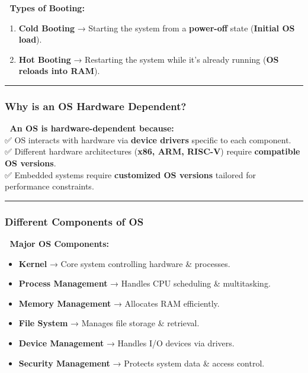\documentclass[
]{article}
\providecommand{\tightlist}{%
  \setlength{\itemsep}{0pt}\setlength{\parskip}{0pt}}
\begin{document}
📌 \textbf{Types of Booting:}

\begin{enumerate}
\def\labelenumi{\arabic{enumi}.}
\tightlist
\item
  \textbf{Cold Booting} → Starting the system from a \textbf{power-off}
  state (\textbf{Initial OS load}).
\item
  \textbf{Hot Booting} → Restarting the system while it's already
  running (\textbf{OS reloads into RAM}).
\end{enumerate}

\begin{center}\rule{0.5\linewidth}{0.5pt}\end{center}

\subsubsection{\texorpdfstring{\textbf{Why is an OS Hardware
Dependent?}}{Why is an OS Hardware Dependent?}}\label{why-is-an-os-hardware-dependent}

📌 \textbf{An OS is hardware-dependent because:}\\
✅ OS interacts with hardware via \textbf{device drivers} specific to
each component.\\
✅ Different hardware architectures (\textbf{x86, ARM, RISC-V}) require
\textbf{compatible OS versions}.\\
✅ Embedded systems require \textbf{customized OS versions} tailored for
performance constraints.

\begin{center}\rule{0.5\linewidth}{0.5pt}\end{center}

\subsubsection{\texorpdfstring{\textbf{Different Components of
OS}}{Different Components of OS}}\label{different-components-of-os}

📌 \textbf{Major OS Components:}

\begin{itemize}
\tightlist
\item
  \textbf{Kernel} → Core system controlling hardware \& processes.
\item
  \textbf{Process Management} → Handles CPU scheduling \& multitasking.
\item
  \textbf{Memory Management} → Allocates RAM efficiently.
\item
  \textbf{File System} → Manages file storage \& retrieval.
\item
  \textbf{Device Management} → Handles I/O devices via drivers.
\item
  \textbf{Security Management} → Protects system data \& access control.
\end{itemize}
\end{document}
